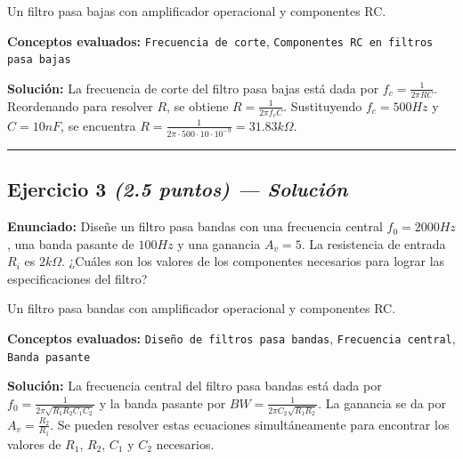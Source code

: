 \documentclass[11pt,a4paper]{article}
\begin{document}
  \begin{tcolorbox}[colback=gray!5, colframe=gray!40, fonttitle=\bfseries, title={Diagrama sugerido}]
    Un filtro pasa bajas con amplificador operacional y componentes RC.
  \end{tcolorbox}

\vspace{2mm}
\textbf{Conceptos evaluados:} \texttt{Frecuencia de corte}, \texttt{Componentes RC en filtros pasa bajas}

\vspace{2mm}
\textbf{Solución:}
La frecuencia de corte del filtro pasa bajas está dada por $f_c = \frac{1}{2\pi RC}$. Reordenando para resolver $R$, se obtiene $R = \frac{1}{2\pi f_c C}$. Sustituyendo $f_c = 500 Hz$ y $C = 10 nF$, se encuentra $R = \frac{1}{2\pi \cdot 500 \cdot 10 \cdot 10^{-9}} = 31.83 k\Omega$.

\vspace{4pt}
\rule{\linewidth}{0.2pt}
\vspace{6pt}



\subsection*{Ejercicio 3 \normalfont\normalsize\textit{(2.5 puntos) --- Solución}}
\textbf{Enunciado:}
Diseñe un filtro pasa bandas con una frecuencia central $f_0 = 2000 Hz$, una banda pasante de $100 Hz$ y una ganancia $A_v = 5$. La resistencia de entrada $R_i$ es $2 k\Omega$. ¿Cuáles son los valores de los componentes necesarios para lograr las especificaciones del filtro?

  \begin{tcolorbox}[colback=gray!5, colframe=gray!40, fonttitle=\bfseries, title={Diagrama sugerido}]
    Un filtro pasa bandas con amplificador operacional y componentes RC.
  \end{tcolorbox}

\vspace{2mm}
\textbf{Conceptos evaluados:} \texttt{Diseño de filtros pasa bandas}, \texttt{Frecuencia central}, \texttt{Banda pasante}

\vspace{2mm}
\textbf{Solución:}
La frecuencia central del filtro pasa bandas está dada por $f_0 = \frac{1}{2\pi \sqrt{R_1 R_2 C_1 C_2}}$ y la banda pasante por $BW = \frac{1}{2\pi C_2 \sqrt{R_1 R_2}}$. La ganancia se da por $A_v = \frac{R_2}{R_1}$. Se pueden resolver estas ecuaciones simultáneamente para encontrar los valores de $R_1$, $R_2$, $C_1$ y $C_2$ necesarios.
\end{document}
